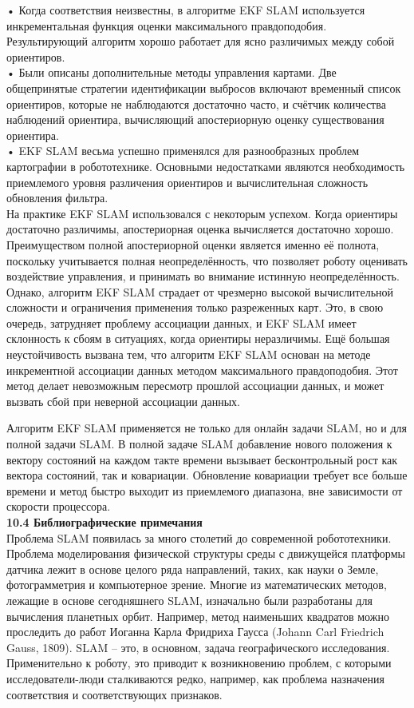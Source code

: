 \documentclass[10pt,a4paper]{article}
\begin{document}
•	Когда соответствия неизвестны, в алгоритме EKF SLAM используется инкрементальная функция оценки максимального правдоподобия. Результирующий алгоритм хорошо работает для ясно различимых между собой ориентиров.\\

•	Были описаны дополнительные методы управления картами. Две общепринятые стратегии идентификации выбросов включают  временный список  ориентиров, которые не наблюдаются достаточно часто, и счётчик количества наблюдений ориентира, вычисляющий апостериорную оценку существования ориентира.\\

•	EKF SLAM весьма успешно применялся для разнообразных проблем картографии в робототехнике. Основными недостатками являются необходимость приемлемого уровня различения ориентиров и вычислительная сложность обновления фильтра.\\

На практике EKF SLAM использовался с некоторым успехом. Когда ориентиры достаточно различимы, апостериорная оценка вычисляется достаточно хорошо. Преимуществом полной апостериорной оценки является именно её полнота, поскольку учитывается полная неопределённость, что позволяет роботу оценивать воздействие управления, и принимать во внимание истинную неопределённость. Однако, алгоритм EKF SLAM страдает от чрезмерно высокой вычислительной сложности и ограничения применения только разреженных карт. Это, в свою очередь, затрудняет проблему ассоциации данных, и EKF SLAM имеет склонность к сбоям в ситуациях, когда ориентиры неразличимы. Ещё большая неустойчивость вызвана тем, что алгоритм EKF SLAM основан на методе инкрементной ассоциации данных методом максимального правдоподобия. Этот метод делает невозможным пересмотр прошлой ассоциации данных, и может вызвать сбой при неверной ассоциации данных.

Алгоритм EKF SLAM применяется не только для онлайн задачи SLAM, но и для полной задачи SLAM. В полной задаче SLAM добавление нового положения к вектору состояний на каждом такте времени вызывает бесконтрольный рост как вектора состояний, так и ковариации. Обновление ковариации требует все больше времени и метод быстро выходит из приемлемого диапазона, вне зависимости от скорости процессора.\\

\textbf{10.4	Библиографические примечания}\\

Проблема SLAM появилась за много столетий до современной робототехники. Проблема моделирования физической структуры среды с движущейся платформы датчика лежит в основе целого ряда направлений, таких, как науки о Земле, фотограмметрия и компьютерное зрение. Многие из математических методов, лежащие в основе  сегодняшнего SLAM, изначально были разработаны для вычисления планетных орбит. Например, метод наименьших квадратов можно проследить до работ Иоганна Карла Фридриха Гаусса (Johann Carl Friedrich Gauss, 1809). SLAM – это, в основном, задача географического исследования. Применительно к роботу, это приводит к возникновению проблем, с которыми исследователи-люди сталкиваются редко, например, как проблема назначения соответствия и соответствующих признаков.
\end{document}
